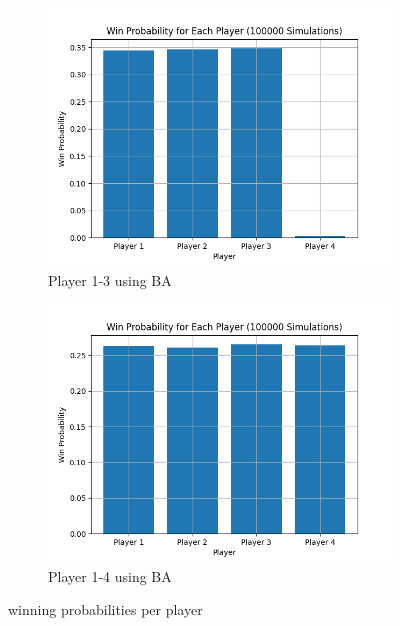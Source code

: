 \documentclass{article}
\begin{document}
\begin{figure}[H]
    \begin{subfigure}{0.45\textwidth}
        \centering
        \includegraphics[width=\linewidth]{winning_probabilities_per_mode_3.png}
        \caption{Player 1-3 using BA}
    \end{subfigure}
    \hfill
    \begin{subfigure}{0.45\textwidth}
        \centering
        \includegraphics[width=\linewidth]{winning_probabilities_per_mode_4.png}
        \caption{Player 1-4 using BA}
    \end{subfigure}

    \caption{winning probabilities per player}
    \label{Fig:winning_prob}
\end{figure}
\end{document}
